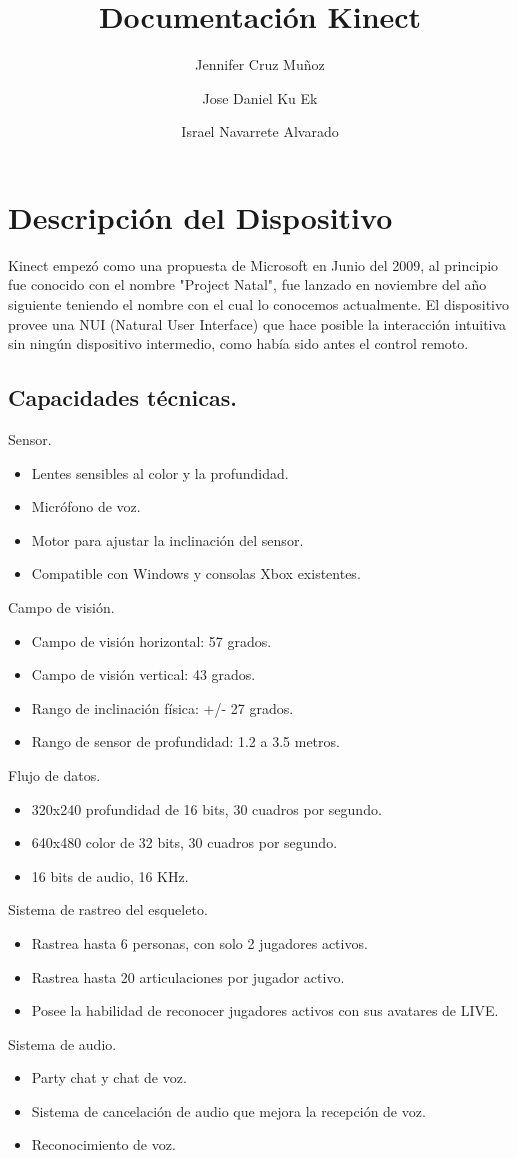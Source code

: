 \documentclass[11pt,a4paper]{article}
\author{Jennifer Cruz Muñoz \and Jose Daniel Ku Ek \and Israel Navarrete Alvarado}
\title{Documentación Kinect}
\begin{document}
\maketitle
\newpage
\tableofcontents
\newpage
\section{Descripción del Dispositivo}
Kinect empezó como una propuesta de Microsoft en Junio del 2009, al principio fue conocido con el nombre "Project Natal", fue lanzado en noviembre del año siguiente teniendo el nombre con el cual lo conocemos actualmente. El dispositivo provee una NUI (Natural User Interface) que hace posible la interacción intuitiva sin ningún dispositivo intermedio, como había sido antes el control remoto.

\subsection{Capacidades técnicas.}
Sensor.
\begin{itemize} %
\item Lentes sensibles al color y la profundidad.
\item Micrófono de voz.
\item Motor para ajustar la inclinación del sensor.
\item Compatible con Windows y consolas Xbox existentes.
\end{itemize}
Campo de visión.
\begin{itemize} 
\item Campo de visión horizontal: 57 grados.
\item Campo de visión vertical: 43 grados.
\item Rango de inclinación física: +/- 27 grados.
\item Rango de sensor de profundidad:  1.2 a 3.5 metros.
\end{itemize}
Flujo de datos. 
\begin{itemize} 
\item 320x240  profundidad de 16 bits, 30 cuadros por segundo.
\item 640x480 color de 32 bits, 30 cuadros por segundo.
\item 16 bits de audio, 16 KHz.
\end{itemize}
Sistema de rastreo del esqueleto.
\begin{itemize} 
\item Rastrea hasta 6 personas, con solo 2 jugadores activos.
\item Rastrea hasta 20 articulaciones por jugador activo.
\item Posee la habilidad de reconocer jugadores activos con sus avatares de LIVE.
\end{itemize}
Sistema de audio.
\begin{itemize} 
\item Party chat y chat de voz.
\item Sistema de cancelación de audio que mejora la recepción de voz.
\item Reconocimiento de voz.
\end{itemize}
\end{document}
